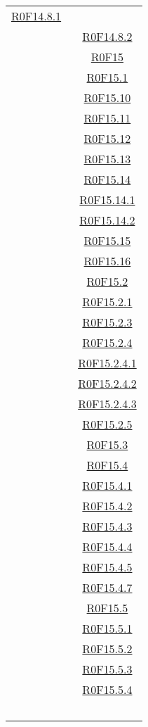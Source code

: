 \documentclass[../AnalisiDeiRequisiti.tex]{subfiles}
\begin{document}
\begin{longtable}{|c|c|}
	\hyperlink{R0F14.8.1}{R0F14.8.1}\\& \
	\hyperlink{R0F14.8.2}{R0F14.8.2}\\& \
	\hyperlink{R0F15}{R0F15}\\& \
	\hyperlink{R0F15.1}{R0F15.1}\\& \
	\hyperlink{R0F15.10}{R0F15.10}\\& \
	\hyperlink{R0F15.11}{R0F15.11}\\& \
	\hyperlink{R0F15.12}{R0F15.12}\\& \
	\hyperlink{R0F15.13}{R0F15.13}\\& \
	\hyperlink{R0F15.14}{R0F15.14}\\& \
	\hyperlink{R0F15.14.1}{R0F15.14.1}\\& \
	\hyperlink{R0F15.14.2}{R0F15.14.2}\\& \
	\hyperlink{R0F15.15}{R0F15.15}\\& \
	\hyperlink{R0F15.16}{R0F15.16}\\& \
	\hyperlink{R0F15.2}{R0F15.2}\\& \
	\hyperlink{R0F15.2.1}{R0F15.2.1}\\& \
	\hyperlink{R0F15.2.3}{R0F15.2.3}\\& \
	\hyperlink{R0F15.2.4}{R0F15.2.4}\\& \
	\hyperlink{R0F15.2.4.1}{R0F15.2.4.1}\\& \
	\hyperlink{R0F15.2.4.2}{R0F15.2.4.2}\\& \
	\hyperlink{R0F15.2.4.3}{R0F15.2.4.3}\\& \
	\hyperlink{R0F15.2.5}{R0F15.2.5}\\& \
	\hyperlink{R0F15.3}{R0F15.3}\\& \
	\hyperlink{R0F15.4}{R0F15.4}\\& \
	\hyperlink{R0F15.4.1}{R0F15.4.1}\\& \
	\hyperlink{R0F15.4.2}{R0F15.4.2}\\& \
	\hyperlink{R0F15.4.3}{R0F15.4.3}\\& \
	\hyperlink{R0F15.4.4}{R0F15.4.4}\\& \
	\hyperlink{R0F15.4.5}{R0F15.4.5}\\& \
	\hyperlink{R0F15.4.7}{R0F15.4.7}\\& \
	\hyperlink{R0F15.5}{R0F15.5}\\& \
	\hyperlink{R0F15.5.1}{R0F15.5.1}\\& \
	\hyperlink{R0F15.5.2}{R0F15.5.2}\\& \
	\hyperlink{R0F15.5.3}{R0F15.5.3}\\& \
	\hyperlink{R0F15.5.4}{R0F15.5.4}\\& \

\end{longtable}
\end{document}

